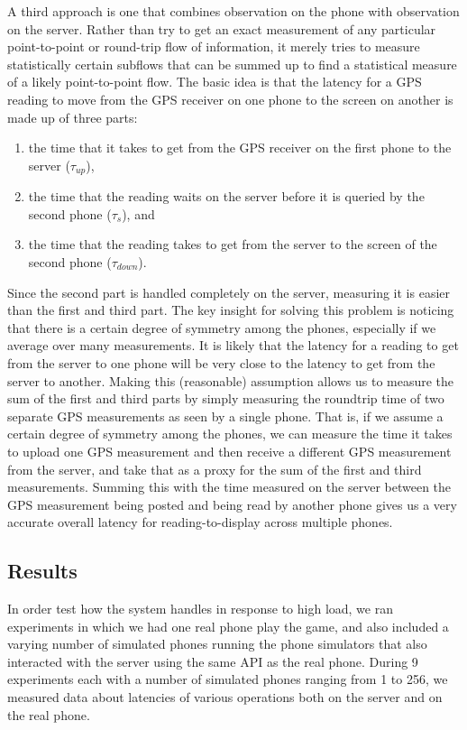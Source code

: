\documentclass{acm_proc_article-sp}
\begin{document}
A third approach is one that combines observation on the phone with
observation on the server.  Rather than try to get an exact
measurement of any particular point-to-point or round-trip flow of
information, it merely tries to measure statistically certain subflows
that can be summed up to find a statistical measure of a likely
point-to-point flow.  The basic idea is that the latency for a GPS
reading to move from the GPS receiver on one phone to the screen on
another is made up of three parts:

\begin{enumerate}
\item the time that it takes to get from the GPS receiver on the first phone to the server ($\tau_{up}$),
\item the time that the reading waits on the server before it is queried by the second phone ($\tau_{s}$), and
\item the time that the reading takes to get from the server to the screen of the second phone ($\tau_{down}$).
\end{enumerate}

Since the second part is handled completely on the server, measuring
it is easier than the first and third part.  The key insight for
solving this problem is noticing that there is a certain degree of
symmetry among the phones, especially if we average over many
measurements.  It is likely that the latency for a reading to get from
the server to one phone will be very close to the latency to get from
the server to another.  Making this (reasonable) assumption allows us
to measure the sum of the first and third parts by simply measuring
the roundtrip time of two separate GPS measurements as seen by a
single phone.  That is, if we assume a certain degree of symmetry
among the phones, we can measure the time it takes to upload one GPS
measurement and then receive a different GPS measurement from the
server, and take that as a proxy for the sum of the first and third
measurements.  Summing this with the time measured on the server
between the GPS measurement being posted and being read by another
phone gives us a very accurate overall latency for reading-to-display
across multiple phones.

\subsection{Results}
In order test how the system handles in response to high load, we ran
experiments in which we had one real phone play the game, and also included
a varying number of simulated phones running the phone simulators that
also interacted with the server using the same API as the real phone.
During 9 experiments each with a number of simulated phones ranging from 1
to 256, we measured data about latencies of various operations both on the
server and on the real phone.
\end{document}
